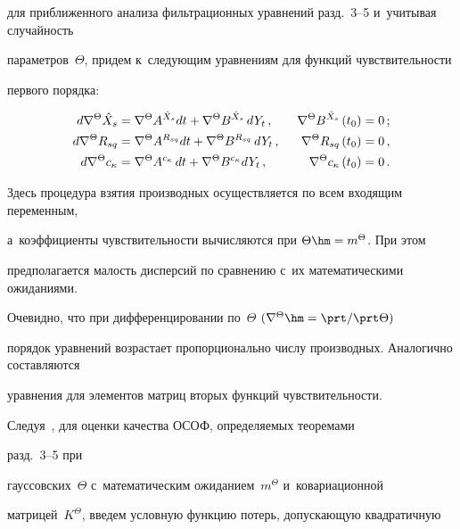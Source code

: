 для приближенного анализа фильтрационных уравнений разд.~3--5 и~учитывая случайность 

па\-ра\-мет\-ров~$\Theta$, придем к~следующим уравнениям для функций чувствительности 

первого порядка:

\begin{alignat*}{2}

d\nabla^\Theta \hat X_s &= \nabla^\Theta A^{\hat X_s} dt + \nabla^\Theta 

B^{\hat X_s}\,dY_t\,,&\enskip \nabla^\Theta B^{\hat X_s}\left(t_0\right) &=0\,;


\\

d\nabla^\Theta R_{sq} &= \nabla^\Theta A^{R_{sq}} dt + \nabla^\Theta B^{R_{sq}}\,dY_t\,,

& \enskip \nabla^\Theta R_{sq}\left(t_0\right) &=0\,,%

\\

d\nabla^\Theta c_{\kappa} &= \nabla^\Theta A^{c_\kappa} \,dt + 

\nabla^\Theta B^{c_\kappa}dY_t\,,&\enskip \nabla^\Theta c_\kappa\left(t_0\right) &=0\,.


\end{alignat*}

Здесь процедура взятия производных осуществляется по всем входящим переменным, 

а~коэффициенты чувствительности вычисляются при  $\Theta\hm=m^\Theta$. При этом 

предполагается малость дисперсий по сравнению с~их математическими ожиданиями. 

Очевидно, что при дифференцировании по~$\Theta$ $(\nabla^\Theta \hm= \prt /\prt\Theta)$

порядок уравнений возрастает пропорционально числу производных. Аналогично со\-став\-ля\-ют\-ся 

уравнения для элементов матриц вторых функций чувствительности.



Следуя~\cite{1-s1, 2-s1}, для оценки качества ОСОФ, определяемых теоремами 

разд.~3--5 при 

гауссовских~$\Theta$ с~математическим ожиданием~$m^\Theta$ и~ковариационной 

мат\-ри\-цей~$K^\Theta$, введем условную функцию потерь, допускающую квадратичную 

